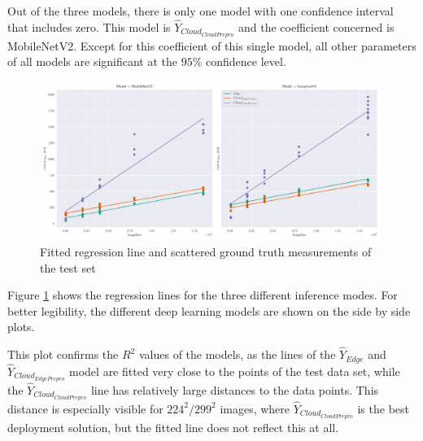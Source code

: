 Out of the three models, there is only one model with one confidence interval that includes zero.
This model is $\hat{Y}_{Cloud_{CloudPrepro}}$ and the coefficient concerned is MobileNetV2.
Except for this coefficient of this single model, all other parameters of all models are significant at the $95\%$ confidence level.




\begin{figure}[!htb]
\centering
\includegraphics[width=0.99\textwidth]{./Bilder/regression.pdf}
\caption{Fitted regression line and scattered ground truth measurements of the test set}
\label{fig:regression}
\end{figure}

Figure \ref{fig:regression} shows the regression lines for the three different inference modes.
For better legibility, the different deep learning models are shown on the side by side plots.

This plot confirms the $R^2$ values of the models, as the lines of the $\hat{Y}_{Edge}$ and $\hat{Y}_{Cloud_{EdgePrepro}}$ model are fitted very close to the points of the test data set, while the $\hat{Y}_{Cloud_{CloudPrepro}}$ line has relatively large distances to the data points.
This distance is especially visible for $224^2/299^2$ images, where $\hat{Y}_{Cloud_{CloudPrepro}}$ is the best deployment solution, but the fitted line does not reflect this at all.



